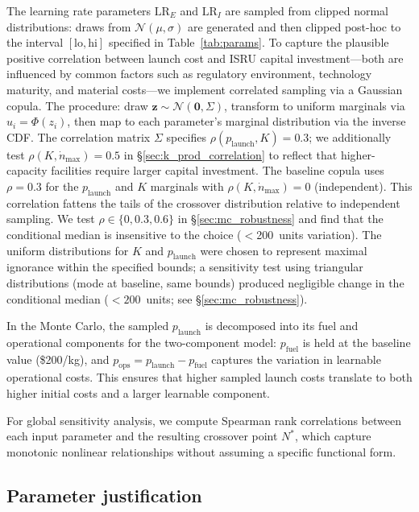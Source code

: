 \documentclass[preprint,12pt]{elsarticle}
\begin{document}
The learning rate parameters $\mathrm{LR}_E$ and $\mathrm{LR}_I$ are sampled from clipped normal distributions: draws from $\mathcal{N}(\mu, \sigma)$ are generated and then clipped post-hoc to the interval $[\mathrm{lo}, \mathrm{hi}]$ specified in Table~\ref{tab:params}. To capture the plausible positive correlation between launch cost and ISRU capital investment---both are influenced by common factors such as regulatory environment, technology maturity, and material costs---we implement correlated sampling via a Gaussian copula. The procedure: draw $\mathbf{z} \sim \mathcal{N}(\mathbf{0}, \Sigma)$, transform to uniform marginals via $u_i = \Phi(z_i)$, then map to each parameter's marginal distribution via the inverse CDF. The correlation matrix $\Sigma$ specifies $\rho(p_{\mathrm{launch}}, K) = 0.3$; we additionally test $\rho(K, \dot{n}_{\max}) = 0.5$ in \S\ref{sec:k_prod_correlation} to reflect that higher-capacity facilities require larger capital investment. The baseline copula uses $\rho = 0.3$ for the $p_{\mathrm{launch}}$ and $K$ marginals with $\rho(K, \dot{n}_{\max}) = 0$ (independent). This correlation fattens the tails of the crossover distribution relative to independent sampling. We test $\rho \in \{0, 0.3, 0.6\}$ in \S\ref{sec:mc_robustness} and find that the conditional median is insensitive to the choice ($<$200~units variation). The uniform distributions for $K$ and $p_{\mathrm{launch}}$ were chosen to represent maximal ignorance within the specified bounds; a sensitivity test using triangular distributions (mode at baseline, same bounds) produced negligible change in the conditional median ($<200$~units; see \S\ref{sec:mc_robustness}).

In the Monte Carlo, the sampled $p_{\mathrm{launch}}$ is decomposed into its fuel and operational components for the two-component model: $p_{\mathrm{fuel}}$ is held at the baseline value (\$200/kg), and $p_{\mathrm{ops}} = p_{\mathrm{launch}} - p_{\mathrm{fuel}}$ captures the variation in learnable operational costs. This ensures that higher sampled launch costs translate to both higher initial costs and a larger learnable component.

For global sensitivity analysis, we compute Spearman rank correlations between each input parameter and the resulting crossover point $N^*$, which capture monotonic nonlinear relationships without assuming a specific functional form.

\subsection{Parameter justification}
\label{sec:param_justification}
\end{document}
